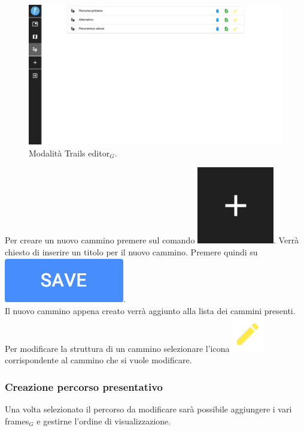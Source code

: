 \begin{figure}[!h]
\begin{center}
\includegraphics[scale=0.35]{img/trails_editor_screen.png}
\caption{Modalità Trails editor$_G$.}
\end{center}
\end{figure}

Per creare un nuovo cammino premere sul comando \includegraphics[scale=0.4]{img/add_object.png}. Verrà chiesto di inserire un titolo per il nuovo cammino. Premere quindi su \includegraphics[scale=0.5]{img/save_confirm.png}.\\
Il nuovo cammino appena creato verrà aggiunto alla lista dei cammini presenti.\\
Per modificare la struttura di un cammino selezionare l'icona \includegraphics[scale=0.7]{img/edit.png} corrispondente al cammino che si vuole modificare.

\newpage
\subsubsection{Creazione percorso presentativo}
Una volta selezionato il percorso da modificare sarà possibile aggiungere i vari frames$_G$ e gestirne l'ordine di visualizzazione.

